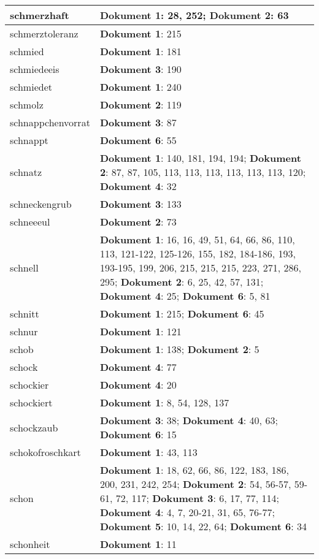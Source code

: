 \documentclass[a5paper]{article}
\begin{document}
\begin{longtable}[l]{|l|p{3in}|}
\hline
schmerzhaft & \textbf{Dokument 1}: 28, 252; \textbf{Dokument 2}: 63 \\
\hline
schmerztoleranz & \textbf{Dokument 1}: 215 \\
\hline
schmied & \textbf{Dokument 1}: 181 \\
\hline
schmiedeeis & \textbf{Dokument 3}: 190 \\
\hline
schmiedet & \textbf{Dokument 1}: 240 \\
\hline
schmolz & \textbf{Dokument 2}: 119 \\
\hline
schnappchenvorrat & \textbf{Dokument 3}: 87 \\
\hline
schnappt & \textbf{Dokument 6}: 55 \\
\hline
schnatz & \textbf{Dokument 1}: 140, 181, 194, 194; \textbf{Dokument 2}: 87, 87, 105, 113, 113, 113, 113, 113, 113, 120; \textbf{Dokument 4}: 32 \\
\hline
schneckengrub & \textbf{Dokument 3}: 133 \\
\hline
schneeeul & \textbf{Dokument 2}: 73 \\
\hline
schnell & \textbf{Dokument 1}: 16, 16, 49, 51, 64, 66, 86, 110, 113, 121-122, 125-126, 155, 182, 184-186, 193, 193-195, 199, 206, 215, 215, 215, 223, 271, 286, 295; \textbf{Dokument 2}: 6, 25, 42, 57, 131; \textbf{Dokument 4}: 25; \textbf{Dokument 6}: 5, 81 \\
\hline
schnitt & \textbf{Dokument 1}: 215; \textbf{Dokument 6}: 45 \\
\hline
schnur & \textbf{Dokument 1}: 121 \\
\hline
schob & \textbf{Dokument 1}: 138; \textbf{Dokument 2}: 5 \\
\hline
schock & \textbf{Dokument 4}: 77 \\
\hline
schockier & \textbf{Dokument 4}: 20 \\
\hline
schockiert & \textbf{Dokument 1}: 8, 54, 128, 137 \\
\hline
schockzaub & \textbf{Dokument 3}: 38; \textbf{Dokument 4}: 40, 63; \textbf{Dokument 6}: 15 \\
\hline
schokofroschkart & \textbf{Dokument 1}: 43, 113 \\
\hline
schon & \textbf{Dokument 1}: 18, 62, 66, 86, 122, 183, 186, 200, 231, 242, 254; \textbf{Dokument 2}: 54, 56-57, 59-61, 72, 117; \textbf{Dokument 3}: 6, 17, 77, 114; \textbf{Dokument 4}: 4, 7, 20-21, 31, 65, 76-77; \textbf{Dokument 5}: 10, 14, 22, 64; \textbf{Dokument 6}: 34 \\
\hline
schonheit & \textbf{Dokument 1}: 11 \\

\end{longtable}
\end{document}
